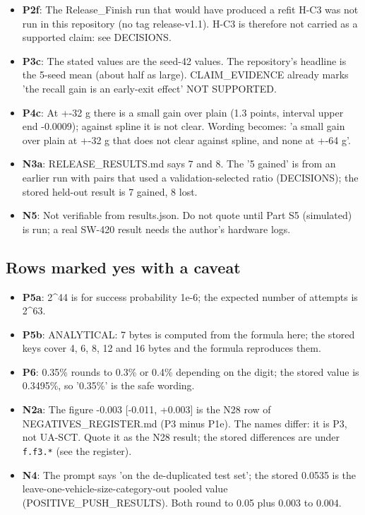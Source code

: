 \begin{itemize}
\item \textbf{P2f}: The Release\_Finish run that would have produced a refit H-C3 was not run in this repository (no tag release-v1.1). H-C3 is therefore not carried as a supported claim: see DECISIONS.
\item \textbf{P3c}: The stated values are the seed-42 values. The repository's headline is the 5-seed mean (about half as large). CLAIM\_EVIDENCE already marks 'the recall gain is an early-exit effect' NOT SUPPORTED.
\item \textbf{P4c}: At +-32 g there is a small gain over plain (1.3 points, interval upper end -0.0009); against spline it is not clear. Wording becomes: 'a small gain over plain at +-32 g that does not clear against spline, and none at +-64 g'.
\item \textbf{N3a}: RELEASE\_RESULTS.md says 7 and 8. The '5 gained' is from an earlier run with pairs that used a validation-selected ratio (DECISIONS); the stored held-out result is 7 gained, 8 lost.
\item \textbf{N5}: Not verifiable from results.json. Do not quote until Part S5 (simulated) is run; a real SW-420 result needs the author's hardware logs.
\end{itemize}

\subsection*{Rows marked yes with a caveat}

\begin{itemize}
\item \textbf{P5a}: 2\textasciicircum{}44 is for success probability 1e-6; the expected number of attempts is 2\textasciicircum{}63.
\item \textbf{P5b}: ANALYTICAL: 7 bytes is computed from the formula here; the stored keys cover 4, 6, 8, 12 and 16 bytes and the formula reproduces them.
\item \textbf{P6}: 0.35\% rounds to 0.3\% or 0.4\% depending on the digit; the stored value is 0.3495\%, so '0.35\%' is the safe wording.
\item \textbf{N2a}: The figure -0.003 [-0.011, +0.003] is the N28 row of NEGATIVES\_REGISTER.md (P3 minus P1e). The names differ: it is P3, not UA-SCT. Quote it as the N28 result; the stored differences are under \texttt{f.f3.*} (see the register).
\item \textbf{N4}: The prompt says 'on the de-duplicated test set'; the stored 0.0535 is the leave-one-vehicle-size-category-out pooled value (POSITIVE\_PUSH\_RESULTS). Both round to 0.05 plus 0.003 to 0.004.
\end{itemize}

